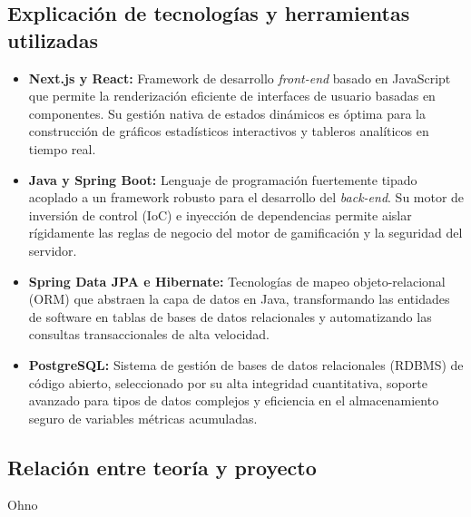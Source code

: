 \documentclass[12pt, atypical, journal]{article}
\begin{document}
\subsection{Explicación de tecnologías y herramientas utilizadas}
\begin{itemize}
   \item \textbf{Next.js y React:} Framework de desarrollo \textit{front-end} basado en JavaScript que permite la renderización eficiente de interfaces de usuario basadas en componentes. Su gestión nativa de estados dinámicos es óptima para la construcción de gráficos estadísticos interactivos y tableros analíticos en tiempo real.
   \item \textbf{Java y Spring Boot:} Lenguaje de programación fuertemente tipado acoplado a un framework robusto para el desarrollo del \textit{back-end}. Su motor de inversión de control (IoC) e inyección de dependencias permite aislar rígidamente las reglas de negocio del motor de gamificación y la seguridad del servidor.
   \item \textbf{Spring Data JPA e Hibernate:} Tecnologías de mapeo objeto-relacional (ORM) que abstraen la capa de datos en Java, transformando las entidades de software en tablas de bases de datos relacionales y automatizando las consultas transaccionales de alta velocidad.
   \item \textbf{PostgreSQL:} Sistema de gestión de bases de datos relacionales (RDBMS) de código abierto, seleccionado por su alta integridad cuantitativa, soporte avanzado para tipos de datos complejos y eficiencia en el almacenamiento seguro de variables métricas acumuladas.
\end{itemize}

\subsection{Relación entre teoría y proyecto}
Ohno
\end{document}
